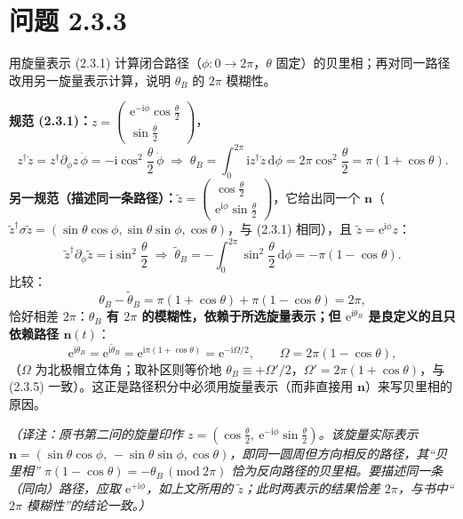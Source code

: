 \section*{问题 2.3.3}
\begin{problem}
用旋量表示 (2.3.1) 计算闭合路径（$\phi:0\to2\pi$，$\theta$ 固定）的贝里相；再对同一路径改用另一旋量表示计算，说明 $\theta_B$ 的 $2\pi$ 模糊性。
\end{problem}
\solution
\textbf{规范 (2.3.1)：}$z=\begin{pmatrix}\mathrm{e}^{-\mathrm{i}\phi}\cos\frac\theta2\\ \sin\frac\theta2\end{pmatrix}$，
\begin{equation*}
z^\dagger\dot z=z^\dagger\partial_\phi z\,\dot\phi=-\mathrm{i}\cos^2\frac\theta2\,\dot\phi
\;\Longrightarrow\;
\theta_B=\int_0^{2\pi}\mathrm{i}z^\dagger\dot z\,\mathrm{d}\phi=2\pi\cos^2\frac\theta2=\pi(1+\cos\theta).
\end{equation*}
\textbf{另一规范（描述同一条路径）：}$\tilde z=\begin{pmatrix}\cos\frac\theta2\\ \mathrm{e}^{\mathrm{i}\phi}\sin\frac\theta2\end{pmatrix}$，它给出同一个 $\pmb n$（$\tilde z^\dagger\sigma\tilde z=(\sin\theta\cos\phi,\sin\theta\sin\phi,\cos\theta)$，与 (2.3.1) 相同），且 $\tilde z=\mathrm{e}^{\mathrm{i}\phi}z$：
\begin{equation*}
\tilde z^\dagger\partial_\phi\tilde z=\mathrm{i}\sin^2\frac\theta2
\;\Longrightarrow\;
\tilde\theta_B=-\int_0^{2\pi}\sin^2\frac\theta2\,\mathrm{d}\phi=-\pi(1-\cos\theta).
\end{equation*}
比较：
\begin{equation*}
\theta_B-\tilde\theta_B=\pi(1+\cos\theta)+\pi(1-\cos\theta)=2\pi ,
\end{equation*}
恰好相差 $2\pi$：\textbf{$\theta_B$ 有 $2\pi$ 的模糊性，依赖于所选旋量表示；但 $\mathrm{e}^{\mathrm{i}\theta_B}$ 是良定义的且只依赖路径 $\pmb n(t)$}：
\begin{equation*}
\mathrm{e}^{\mathrm{i}\theta_B}=\mathrm{e}^{\mathrm{i}\tilde\theta_B}=\mathrm{e}^{\mathrm{i}\pi(1+\cos\theta)}
=\mathrm{e}^{-\mathrm{i}\Omega/2},\qquad \Omega=2\pi(1-\cos\theta),
\end{equation*}
（$\Omega$ 为北极帽立体角；取补区则等价地 $\theta_B\equiv+\Omega'/2$，$\Omega'=2\pi(1+\cos\theta)$，与 (2.3.5) 一致）。这正是路径积分中必须用旋量表示（而非直接用 $\pmb n$）来写贝里相的原因。

\emph{（译注：原书第二问的旋量印作 $z=(\cos\frac\theta2,\ \mathrm{e}^{-\mathrm{i}\phi}\sin\frac\theta2)$。该旋量实际表示 $\pmb n=(\sin\theta\cos\phi,\,-\sin\theta\sin\phi,\cos\theta)$，即同一圆周但方向相反的路径，其“贝里相” $\pi(1-\cos\theta)=-\theta_B\,( \mathrm{mod}\ 2\pi)$ 恰为反向路径的贝里相。要描述同一条（同向）路径，应取 $\mathrm{e}^{+\mathrm{i}\phi}$，如上文所用的 $\tilde z$；此时两表示的结果恰差 $2\pi$，与书中“$2\pi$ 模糊性”的结论一致。）}


